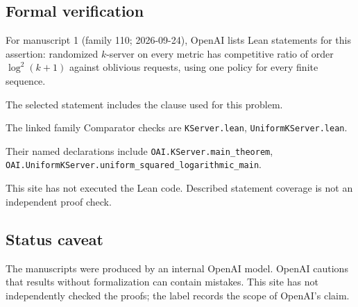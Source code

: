 \documentclass[11pt]{article}
\begin{document}
\subsection{Formal verification}
For manuscript 1 (family 110; 2026-09-24), OpenAI lists Lean statements for this assertion: randomized $k$-server on every metric has competitive ratio of order $\log^2(k+1)$ against oblivious requests, using one policy for every finite sequence.

The selected statement includes the clause used for this problem.

The linked family Comparator checks are \texttt{KServer.lean}, \texttt{UniformKServer.lean}.

Their named declarations include \texttt{OAI.KServer.main\_theorem}, \texttt{OAI.UniformKServer.uniform\_squared\_logarithmic\_main}.

This site has not executed the Lean code. Described statement coverage is not an independent proof check.

\subsection{Status caveat}
The manuscripts were produced by an internal OpenAI model. OpenAI cautions that results without formalization can contain mistakes. This site has not independently checked the proofs; the label records the scope of OpenAI's claim.
\end{document}
